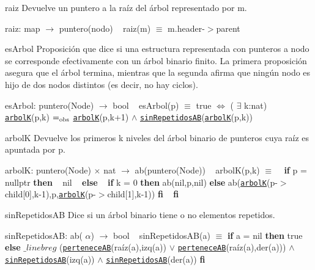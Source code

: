 \begin{DoxyParagraph}{raiz}
Devuelve un puntero a la raíz del árbol representado por m.

raiz\+: map $\to$ puntero(nodo) ~\newline
raiz(m) $\equiv$ m.\+header-\/$>$parent


\end{DoxyParagraph}
\begin{DoxyParagraph}{es\+Arbol}
Proposición que dice si una estructura representada con punteros a nodo se corresponde efectivamente con un árbol binario finito. La primera proposición asegura que el árbol termina, mientras que la segunda afirma que ningún nodo es hijo de dos nodos distintos (es decir, no hay ciclos).

es\+Arbol\+: puntero(\+Node) $\to$ bool ~\newline
es\+Arbol(p) $\equiv$ true $\Leftrightarrow$ ( $\exists$ k\+:nat) \href{axiomas.html#arbolK}{\tt arbolK}(p,k) $=_{\rm obs}$ \href{axiomas.html#arbolK}{\tt arbolK}(p,k+1) $\land$ \href{axiomas.html#sinRepetidosAB}{\tt sin\+Repetidos\+AB}(\href{axiomas.html#arbolK}{\tt arbolK}(p,k))


\end{DoxyParagraph}
\begin{DoxyParagraph}{arbolK}
Devuelve los primeros k niveles del árbol binario de punteros cuya raíz es apuntada por p.

arbolK\+: puntero(\+Node) $\times$ nat $\to$ ab(puntero(\+Node)) ~\newline
arbol\+K(p,k) $\equiv$ ~\newline
 {\bfseries if} p = nullptr {\bfseries then} ~\newline
 nil ~\newline
 {\bfseries else} ~\newline
{\bfseries if} k = 0 {\bfseries then} ab(nil,p,nil) {\bfseries else} ab(\href{axiomas.html#arbolK}{\tt arbolK}(p-\/$>$child\mbox{[}0\mbox{]},k-\/1),p,\href{axiomas.html#arbolK}{\tt arbolK}(p-\/$>$child\mbox{[}1\mbox{]},k-\/1)) {\bfseries fi} ~\newline
 {\bfseries fi} 


\end{DoxyParagraph}
\begin{DoxyParagraph}{sin\+Repetidos\+AB}
Dice si un árbol binario tiene o no elementos repetidos.

sin\+Repetidos\+AB\+: ab( $\alpha$) $\to$ bool ~\newline
sin\+Repetidos\+A\+B(a) $\equiv$ {\bfseries if} a = nil {\bfseries then} true {\bfseries else} $\_linebr eg$ (\href{axiomas.html#perteneceAB}{\tt pertenece\+AB}(raíz(a),izq(a)) $\lor$ \href{axiomas.html#perteneceAB}{\tt pertenece\+AB}(raíz(a),der(a))) $\land$ \href{axiomas.html#sinRepetidosAB}{\tt sin\+Repetidos\+AB}(izq(a)) $\land$ \href{axiomas.html#sinRepetidosAB}{\tt sin\+Repetidos\+AB}(der(a)) {\bfseries fi} 


\end{DoxyParagraph}
